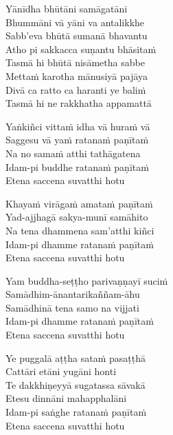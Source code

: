 

\bigskip

\begin{paritta}

Yānīdha bhūtāni samāgatāni\\
Bhummāni vā yāni va antalikkhe\\
Sabb'eva bhūtā sumanā bhavantu\\
Atho pi sakkacca suṇantu bhāsitaṁ\\
Tasmā hi bhūtā nisāmetha sabbe\\
Mettaṁ karotha mānusiyā pajāya\\
Divā ca ratto ca haranti ye baliṁ\\
Tasmā hi ne rakkhatha appamattā


\label{yankinci-vittam}
%
Yaṅkiñci vittaṁ idha vā huraṁ vā\\
Saggesu vā yaṁ ratanaṁ paṇītaṁ\\
Na no samaṁ atthi tathāgatena\\
Idam-pi buddhe ratanaṁ paṇītaṁ\\
Etena saccena suvatthi hotu

%
Khayaṁ virāgaṁ amataṁ paṇītaṁ\\
Yad-ajjhagā sakya-munī samāhito\\
Na tena dhammena sam'atthi kiñci\\
Idam-pi dhamme ratanaṁ paṇītaṁ\\
Etena saccena suvatthi hotu

%
Yam buddha-seṭṭho parivaṇṇayī suciṁ\\
Samādhim-ānantarikaññam-āhu\\
Samādhinā tena samo na vijjati\\
Idam-pi dhamme ratanaṁ paṇītaṁ\\
Etena saccena suvatthi hotu

%
Ye puggalā aṭṭha sataṁ pasaṭṭhā\\
Cattāri etāni yugāni honti\\
Te dakkhiṇeyyā sugatassa sāvakā\\
Etesu dinnāni mahapphalāni\\
Idam-pi saṅghe ratanaṁ paṇītaṁ\\
Etena saccena suvatthi hotu


\end{paritta}
